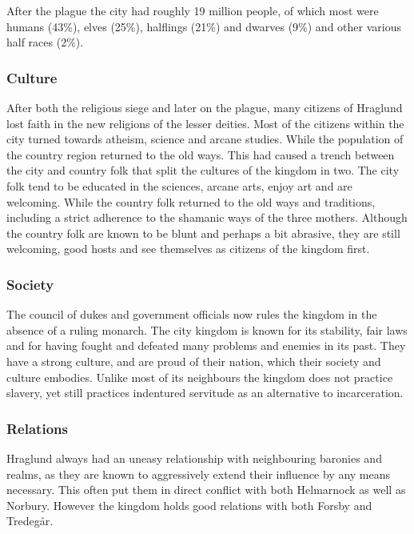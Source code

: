 After the plague the city had roughly 19 million people, of which most were
humans (43\%), elves (25\%), halflings (21\%) and dwarves (9\%) and other
various half races (2\%).

\subsubsection*{Culture}

After both the religious siege and later on the plague, many citizens of
Hraglund lost faith in the new religions of the lesser deities. Most of
the citizens within the city turned towards atheism, science and arcane
studies. While the population of the country region returned to the old
ways. This had caused a trench between the city and country folk that split
the cultures of the kingdom in two. The city folk tend to be educated in
the sciences, arcane arts, enjoy art and are welcoming. While the country folk
returned to the old ways and traditions, including a strict adherence to the
shamanic ways of the three mothers. Although the country folk are known to be
blunt and perhaps a bit abrasive, they are still welcoming, good hosts and see
themselves as citizens of the kingdom first.

\subsubsection*{Society}

The council of dukes and government officials now rules the kingdom in the
absence of a ruling monarch. The city kingdom is known for its stability,
fair laws and for having fought and defeated many problems and enemies in
its past. They have a strong culture, and are proud of their nation, which
their society and culture embodies. Unlike most of its neighbours the kingdom
does not practice slavery, yet still practices indentured servitude as an
alternative to incarceration.

\subsubsection*{Relations}

Hraglund always had an uneasy relationship with neighbouring baronies
and realms, as they are known to aggressively extend their influence by any
means necessary. This often put them in direct conflict with both
Helmarnock as well as Norbury. However the kingdom holds good
relations with both Forsby and Tredegår.
